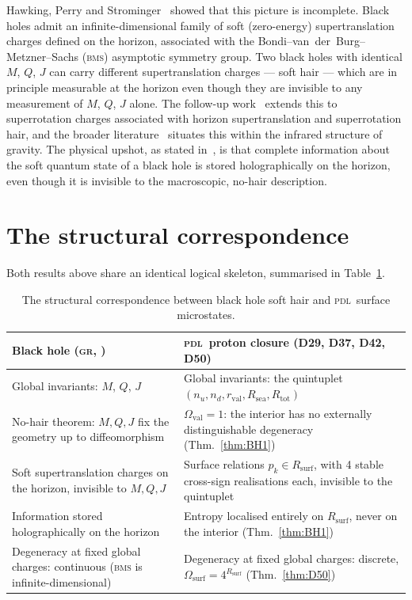 \documentclass[12pt,a4paper]{article}
\newcommand{\PDL}{\textsc{pdl}}
\newcommand{\Rsurf}{R_{\mathrm{surf}}}
\newcommand{\Rtot}{R_{\mathrm{tot}}}
\newcommand{\rval}{r_{\mathrm{val}}}
\newcommand{\Rsea}{R_{\mathrm{sea}}}
\newcommand{\Omegasurf}{\Omega_{\mathrm{surf}}}
\begin{document}
Hawking, Perry and Strominger~\cite{HPS2016} showed that this picture is incomplete. Black holes admit an infinite-dimensional family of soft (zero-energy) supertranslation charges defined on the horizon, associated with the Bondi--van~der~Burg--Metzner--Sachs (\textsc{bms}) asymptotic symmetry group. Two black holes with identical $M$, $Q$, $J$ can carry different supertranslation charges --- soft hair --- which are in principle measurable at the horizon even though they are invisible to any measurement of $M$, $Q$, $J$ alone. The follow-up work~\cite{HPS2017} extends this to superrotation charges associated with horizon supertranslation and superrotation hair, and the broader literature~\cite{Strominger2014,DonnayEtAl2016} situates this within the infrared structure of gravity. The physical upshot, as stated in~\cite{HPS2016}, is that complete information about the soft quantum state of a black hole is stored holographically on the horizon, even though it is invisible to the macroscopic, no-hair description.

\clearpage

\section{The structural correspondence}
\label{sec:correspondence}

Both results above share an identical logical skeleton, summarised in Table~\ref{tab:correspondence}.

\begin{table}[H]
\centering
\caption{The structural correspondence between black hole soft hair and
\PDL\ surface microstates.}
\label{tab:correspondence}
\begin{tabular}{p{5.5cm}p{5.5cm}}
\toprule
Black hole (\textsc{gr}, \cite{HPS2016,HPS2017}) & \PDL\ proton closure (D29, D37, D42, D50) \\
\midrule
Global invariants: $M$, $Q$, $J$ & Global invariants: the quintuplet $(n_u,n_d,\rval,\Rsea,\Rtot)$ \\[4pt]
No-hair theorem: $M,Q,J$ fix the geometry up to diffeomorphism & $\Omega_{\mathrm{val}}=1$: the interior has no externally distinguishable degeneracy (Thm.~\ref{thm:BH1}) \\[4pt]
Soft supertranslation charges on the horizon, invisible to $M,Q,J$ & Surface relations $p_k \in \Rsurf$, with 4 stable cross-sign realisations each, invisible to the quintuplet \\[4pt]
Information stored holographically on the horizon~\cite{HPS2016} & Entropy localised entirely on $\Rsurf$, never on the interior (Thm.~\ref{thm:BH1}) \\[4pt]
Degeneracy at fixed global charges: continuous (\textsc{bms} is infinite-dimensional) & Degeneracy at fixed global charges: discrete, $\Omegasurf = 4^{\Rsurf}$ (Thm.~\ref{thm:D50}) \\
\bottomrule
\end{tabular}
\end{table}
\end{document}
